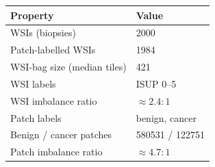 \begin{tabular}{ll}
\toprule
Property & Value\\
\midrule
WSIs (biopsies) & \num{2000}\\
Patch-labelled WSIs & \num{1984}\\
WSI-bag size (median tiles) & \num{421}\\
WSI labels & ISUP 0--5\\
WSI imbalance ratio & ${\approx}\num{2.4}{:}1$\\
Patch labels & benign, cancer\\
Benign / cancer patches & \num{580531} / \num{122751}\\
Patch imbalance ratio & ${\approx}\num{4.7}{:}1$\\
\bottomrule
\end{tabular}
